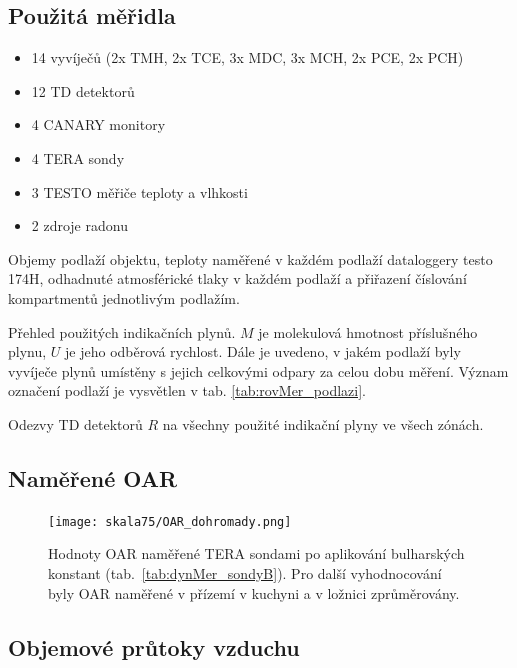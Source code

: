\subsection{Použitá měřidla}
\begin{itemize}
    \setlength\itemsep{0em}
	\item 14 vyvíječů (2x TMH, 2x TCE, 3x MDC, 3x MCH, 2x PCE, 2x PCH)
	\item 12 TD detektorů
	\item 4 CANARY monitory
	\item 4 TERA sondy
	\item 3 TESTO měřiče teploty a vlhkosti
	\item 2 zdroje radonu
\end{itemize}
\begin{table}[H]
    \centering
    \caption{Objemy podlaží objektu, teploty naměřené v každém podlaží dataloggery testo 174H, odhadnuté atmosférické tlaky v každém podlaží a přiřazení číslování kompartmentů jednotlivým podlažím.}
    \label{tab:skala75_objemy}
    
\end{table}
\begin{table}[H]
    \centering
    \caption{Přehled použitých indikačních plynů. $M$ je molekulová hmotnost příslušného plynu, $U$ je jeho odběrová rychlost. Dále je uvedeno, v jakém podlaží byly vyvíječe plynů umístěny s jejich celkovými odpary za celou dobu měření. Význam označení podlaží je vysvětlen v tab. \ref{tab:rovMer_podlazi}.}
    \label{tab:skala75_indikacniPlyny}
    
\end{table}
\begin{table}[H]
    \centering
    \caption{Odezvy TD detektorů $R$ na všechny použité indikační plyny ve všech zónách.}
    \label{tab:skala75_odezvyTD}
    
\end{table}

\subsection{Naměřené OAR}
\begin{figure}[H]
    \centering
    \texttt{[image: skala75/OAR\_dohromady.png]}
    \caption{Hodnoty OAR naměřené TERA sondami po aplikování bulharských konstant (tab.~\ref{tab:dynMer_sondyB}). Pro další vyhodnocování byly OAR naměřené v přízemí v kuchyni a v ložnici zprůměrovány.}
    \label{fig:skala75_OARdohromady}
\end{figure}
\subsection{Objemové průtoky vzduchu}

